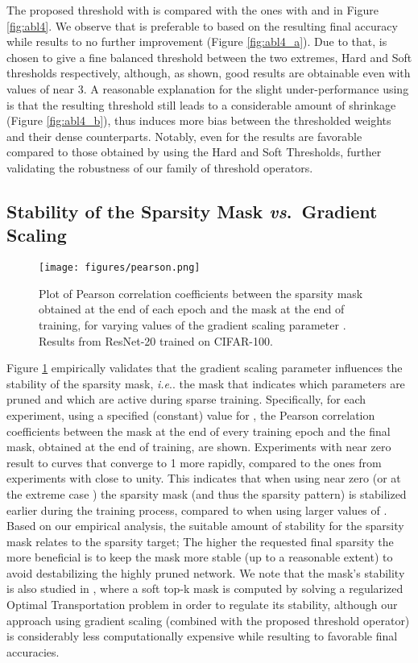 \documentclass{article}
\makeatletter
\DeclareRobustCommand\onedot{\futurelet\@let@token\@onedot}
\def\@onedot{\ifx\@let@token.\else.\null\fi\xspace}
\def\ie{\emph{i.e}\onedot}
\makeatother
\begin{document}
The proposed threshold with  is compared with the ones with  and  in Figure \ref{fig:abl4}. We observe that  is preferable to  based on the resulting final accuracy while   results to no further improvement (Figure \ref{fig:abl4_a}). Due to that,  is chosen to
give a fine balanced threshold between the two extremes, Hard and Soft thresholds respectively, although, as shown, good results are obtainable even with values of  near 3. A reasonable explanation for the slight under-performance using  is that the resulting threshold still leads to a considerable amount of shrinkage (Figure \ref{fig:abl4_b}), thus induces more bias between the thresholded weights and their dense counterparts. Notably, even for  the results are favorable compared to those obtained by using the Hard and Soft Thresholds, further validating the robustness of our family of threshold operators.


\subsection{Stability of the Sparsity Mask \emph{vs}.\ Gradient Scaling}


\begin{figure}[ht]
	\centering
  \texttt{[image: figures/pearson.png]}
\caption{ Plot of Pearson correlation coefficients between the sparsity mask obtained at the end of each epoch and the mask at the end of training, for varying values of the gradient scaling parameter . Results from ResNet-20 trained on CIFAR-100.} 
\label{fig:abl5}
\end{figure}


Figure \ref{fig:abl5} empirically validates that the gradient scaling parameter  influences the stability of the sparsity mask, \ie the mask that indicates which parameters are pruned and which are active during sparse training.  Specifically, for each experiment, using a specified (constant) value for , the Pearson correlation coefficients between the mask at the end of every training epoch and the final mask, obtained at the end of training, are shown. Experiments with  near zero result to curves that converge to 1 more rapidly, compared to the ones from experiments with  close to unity. This indicates that when using  near zero (or at the extreme case ) the sparsity mask (and thus the sparsity pattern) is stabilized earlier during the training process, compared to when using larger values of . Based on our empirical analysis, the suitable amount of stability for the sparsity mask relates to the sparsity target; The higher the requested final sparsity the more beneficial is to keep the mask more stable (up to a reasonable extent) to avoid destabilizing the highly pruned network.  We note that the mask's stability is also studied in \cite{tai2022spartan}, where a soft top-k mask is computed by solving a regularized Optimal Transportation problem in order to regulate its stability, although our approach using gradient scaling (combined with the proposed threshold operator) is considerably less computationally expensive while resulting to favorable final accuracies. 
\end{document}
